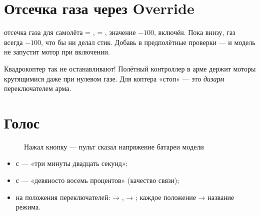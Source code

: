 \section{Отсечка газа через Override}

\begin{recipe}{отсечка газа для самолёта}
 = ,  = , значение $-100$,
 включён. Пока  внизу, газ всегда $-100$, что бы ни делал стик. Добавь
 в предполётные проверки --- и модель не запустит мотор при включении.
\end{recipe}

\begin{caution}
Квадрокоптер так не останавливают! Полётный контроллер в арме держит моторы крутящимися даже
при нулевом газе. Для коптера «стоп» --- это \emph{дизарм} переключателем арма.
\end{caution}

\section{Голос}

\begin{figure}[H]
\centering
{}
\caption{Нажал кнопку --- пульт сказал напряжение батареи модели}
\end{figure}

\begin{itemize}
  \item {} с  --- «три минуты двадцать секунд»;
  \item {} с  --- «девяносто восемь процентов» (качество связи);
  \item {} на положения переключателей:  → ,
         → ; каждое положение  → название режима.
\end{itemize}

